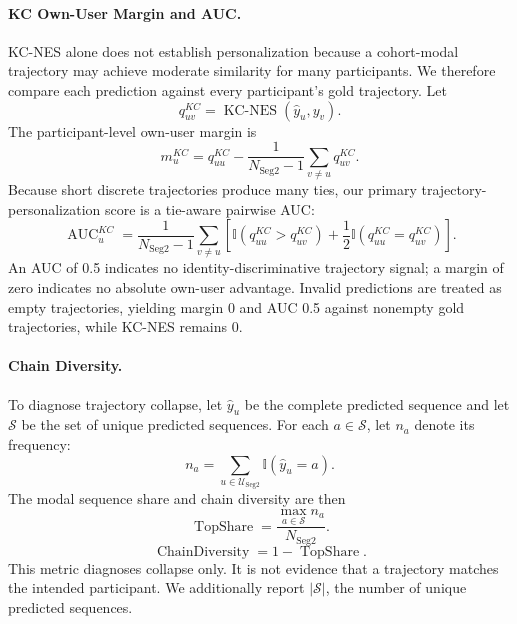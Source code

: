 \paragraph{KC Own-User Margin and AUC.}
KC-NES alone does not establish personalization because a cohort-modal trajectory may achieve moderate similarity for many participants. We therefore compare each prediction against every participant's gold trajectory. Let
\begin{equation}
q^{KC}_{uv}=\operatorname{KC\text{-}NES}(\hat y_u,y_v).
\end{equation}
The participant-level own-user margin is
\begin{equation}
m_u^{KC}=q^{KC}_{uu}-\frac{1}{N_{\mathrm{Seg2}}-1}
\sum_{v\ne u}q^{KC}_{uv}.
\label{eq:kc_own_margin}
\end{equation}
Because short discrete trajectories produce many ties, our primary trajectory-personalization score is a tie-aware pairwise AUC:
\begin{equation}
\operatorname{AUC}^{KC}_u=\frac{1}{N_{\mathrm{Seg2}}-1}
\sum_{v\ne u}\left[
\mathbb I(q^{KC}_{uu}>q^{KC}_{uv})+
\frac12\mathbb I(q^{KC}_{uu}=q^{KC}_{uv})\right].
\label{eq:kc_own_auc}
\end{equation}
An AUC of 0.5 indicates no identity-discriminative trajectory signal; a margin of zero indicates no absolute own-user advantage. Invalid predictions are treated as empty trajectories, yielding margin 0 and AUC 0.5 against nonempty gold trajectories, while KC-NES remains 0.

\paragraph{Chain Diversity.}
To diagnose trajectory collapse, let $\hat y_u$ be the complete predicted sequence and let $\mathcal S$ be the set of unique predicted sequences. For each $a\in\mathcal S$, let $n_a$ denote its frequency:
\begin{equation}
n_a=\sum_{u\in\mathcal U_{\mathrm{Seg2}}}\mathbb I(\hat y_u=a).
\label{eq:sequence_frequency}
\end{equation}
The modal sequence share and chain diversity are then
\begin{equation}
\operatorname{TopShare}=\frac{\max_{a\in\mathcal S}n_a}{N_{\mathrm{Seg2}}}.
\label{eq:top_share}
\end{equation}
\begin{equation}
\operatorname{ChainDiversity}=1-\operatorname{TopShare}.
\label{eq:chain_diversity}
\end{equation}
This metric diagnoses collapse only. It is not evidence that a trajectory matches the intended participant. We additionally report $|\mathcal S|$, the number of unique predicted sequences.

